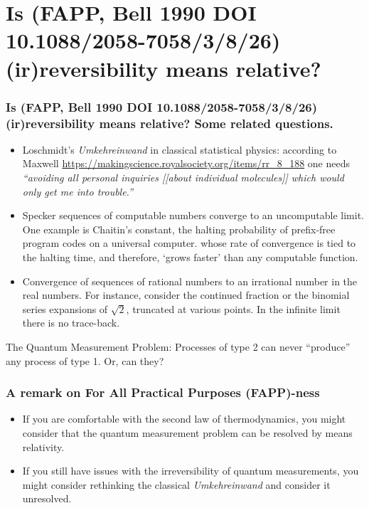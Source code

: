 \documentclass[amsmath,table,sans,amsfonts,hyperref={colorlinks,citecolor=blue,linkcolor=blue,urlcolor=purple}]{beamer}
\begin{document}
 \section{Is  (FAPP, Bell 1990 DOI 10.1088/2058-7058/3/8/26) (ir)reversibility means relative?}

\begin{frame}%
 \frametitle{Is  (FAPP, Bell 1990 DOI 10.1088/2058-7058/3/8/26) (ir)reversibility means relative?
Some related questions.}


\begin{itemize}

\pause
\item   \color{magenta}
Loschmidt's \textit{Umkehreinwand} in classical statistical physics: according to Maxwell
\url{https://makingscience.royalsociety.org/items/rr_8_188} one needs
\textit{``avoiding all personal inquiries [[about individual molecules]] which would only get me into trouble.''}

\pause
\item  \color{magenta}
Specker sequences of computable numbers converge to an uncomputable limit.
One example is Chaitin's constant, the halting probability of prefix-free program codes on a universal computer.
whose rate of convergence is tied to the halting time, and therefore, `grows faster' than any computable function.

\pause
\item  \color{magenta}
Convergence of sequences of rational numbers to an irrational number in the real numbers.
For instance, consider the continued fraction or the binomial series expansions
of \(\sqrt{2}\), truncated at various points.
In the infinite limit there is no trace-back.

\end{itemize}


\pause
\color{blue}
The Quantum Measurement Problem:
Processes of type 2 can never ``produce'' any process of type 1. Or, can they?

\end{frame}

\begin{frame}%
 \frametitle{A remark on For All Practical Purposes (FAPP)-ness}


{\Large
\begin{itemize}

\pause
\item  \color{magenta}
If you are comfortable with the second law of thermodynamics, you might consider that the quantum measurement problem can be resolved by means relativity.

\pause
\item  \color{magenta}
If you still have issues with the irreversibility of quantum measurements, you might consider rethinking the classical \textit{Umkehreinwand} and consider it unresolved.

\end{itemize}
}
\end{frame}
\end{document}
